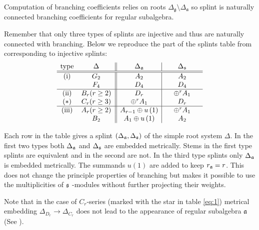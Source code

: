 \documentclass{article}
\newcommand{\gf}{\mathfrak{g}}
\newcommand{\af}{\mathfrak{a}}
\begin{document}
Computation of branching coefficients relies on roots $\Delta_{\gf}\setminus \Delta_{\af}$
\cite{2010arXiv1007.0318L} so splint  is naturally connected branching coefficients for regular
subalgebra.


Remember that only three types of splints are
injective and thus are naturally connected with branching. Below we
reproduce the part of the splints table from \cite{richter2008splints} corresponding to
injective splints:
\begin{equation}
\label{eq:1}
\begin{array}{cc||c|c}
\hbox{type} & \hspace{0.25in}\Delta \hspace{0.25in} & \hspace{0.25in}\Delta
_{\frak{a}}\hspace{0.25in} & \hspace{0.25in}\Delta _{\frak{s}}\hspace{0.25in}
\\ \hline\hline
\hbox{(i)} & G_{2} & A_{2} & A_{2} \\
& F_{4} & D_{4} & D_{4} \\ \hline
\hbox{(ii)} & B_{r}(r\geq 2) & D_{r} & \oplus ^{r}A_{1} \\
(*)& C_{r}(r\geq 3) & \oplus ^{r}A_{1} &  D_{r} \\ \hline
\hbox{(iii)} & A_{r}(r\geq 2) & A_{r-1}\oplus u\left( 1\right)  & \oplus
^{r}A_{1} \\
& B_{2} & A_{1}\oplus u\left( 1\right)  & A_{2}
\end{array}
\end{equation}

Each row in the table gives a splint $(\Delta _{\frak{a}},\Delta _{\frak{s}})
$ of the simple root system $\Delta $. In the first two types both $\Delta _{%
\frak{a}}$ and $\Delta _{\frak{s}}$ are embedded metrically. Stems in the
first type splints are equivalent and in the second are not. In the third
type splints only $\Delta _{\frak{a}}$ is embedded metrically. The summands $%
u\left( 1\right) $ are added to keep $r_{\frak{a}}=r$. This does not change
the principle properties of branching but makes it possible to use the
multiplicities of $\frak{s}$ -modules without further projecting their
weights.

Note that in the case of $C_{r}$-series (marked with the star in table \eqref{eq:1}) metrical
embedding $\Delta_{D_{r}}\to \Delta_{C_{r}}$ does not lead to the appearance of regular subalgebra
$\mathfrak{a}$ (See \cite{dynkin1952semisimple}).
\end{document}
